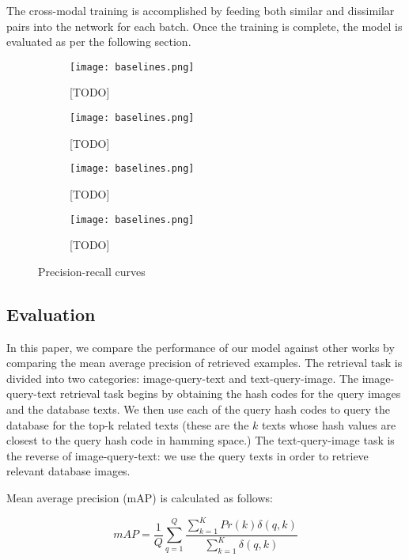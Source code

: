 \documentclass[letterpaper]{article}
\begin{document}
The cross-modal training is accomplished by feeding both similar and dissimilar pairs into the network for each batch. Once the training is complete, the model is evaluated as per the following section.

\begin{figure*}[]
	
	\begin{subfigure}{0.24\textwidth}
		\texttt{[image: baselines.png]}
		\caption{[TODO]}
	\end{subfigure}
	\begin{subfigure}{0.24\textwidth}
		\texttt{[image: baselines.png]}
		\caption{[TODO]}
	\end{subfigure}
	\begin{subfigure}{0.24\textwidth}
		\texttt{[image: baselines.png]}
		\caption{[TODO]}
	\end{subfigure}
	\begin{subfigure}{0.24\textwidth}
		\texttt{[image: baselines.png]}
		\caption{[TODO]}
	\end{subfigure}
	\caption{\label{fig:precrec}Precision-recall curves}
\end{figure*}

\subsection{Evaluation}

In this paper, we compare the performance of our model against other works by comparing the mean average precision of retrieved examples. The retrieval task is divided into two categories: image-query-text and text-query-image. The image-query-text retrieval task begins by obtaining the hash codes for the query images and the database texts. We then use each of the query hash codes to query the database for the top-k related texts (these are the $ k $ texts whose hash values are closest to the query hash code in hamming space.) The text-query-image task is the reverse of image-query-text: we use the query texts in order to retrieve relevant database images.

Mean average precision (mAP) is calculated as follows:

\begin{equation}
\label{eq:map}
mAP = \frac{1}{Q} \sum_{q=1}^Q \frac{\sum_{k=1}^K Pr(k)\delta(q,k)}{\sum_{k=1}^K\delta(q,k)} 
\end{equation}
\end{document}
